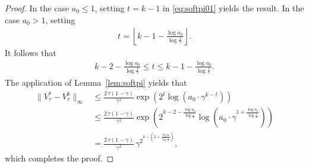 \begin{proof}
    In the case $a_0\leq 1$, setting $t=k-1$ in \eqref{eq:softpi01} yields the result. In the case $a_0>1$, setting 
    \begin{align*}
        t = \left\lfloor k-1-\frac{\log a_0}{\log\frac{1}{\gamma}}\right\rfloor.
    \end{align*}
    It follows that 
    \begin{align*}
     k-2-\frac{\log a_0}{\log\frac{1}{\gamma}}   \leq t\leq k-1-\frac{\log a_0}{\log\frac{1}{\gamma}}.
    \end{align*}
    The application of Lemma~\ref{lem:softpi} yields that 
    \begin{align*}
        \|V_\tau^*-V_\tau^k\|_\infty&\leq \frac{2\,\tau(1-\gamma)}{\gamma^2}\exp\left(2^t\log\left(a_0\cdot\gamma^{k-t}\right)\right)\\
        &\leq \frac{2\,\tau(1-\gamma)}{\gamma^2}\exp\left(2^{k-2-\frac{\log a_0}{\log\frac{1}{\gamma}} }\log\left(a_0\cdot\gamma^{1+\frac{\log a_0}{\log\frac{1}{\gamma}}}\right)\right)\\
        &=\frac{2\,\tau(1-\gamma)}{\gamma^2}\,\gamma^{\displaystyle 2^{ k-\left(2+\frac{\log a_0}{\log\frac{1}{\gamma}}\right)}},
    \end{align*}
    which completes the proof.
\end{proof}

